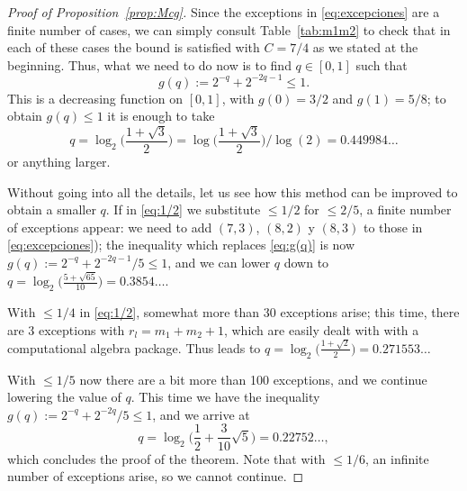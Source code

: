 \documentclass[11pt, a4paper]{article}
\theoremstyle{plain}
\theoremstyle{definition}
\begin{document}
\begin{proof}[Proof of Proposition~\ref{prop:Mcg}]
Since the exceptions in \eqref{eq:excepciones} are a finite number of cases, we can simply consult Table~\ref{tab:m1m2} to check that in each of these cases the bound is satisfied with $C=7/4$ as we stated at the beginning.
Thus, what we need to do now is to find $q \in [0,1]$ such that
\begin{equation}
\label{eq:g(q)}
g(q) := 2^{-q} + 2^{-2q-1} \le 1.
\end{equation}
This is a decreasing function on $[0,1]$, with $g(0)=3/2$ and $g(1)=5/8$; to obtain
$g(q)\le1$ it is enough to take
\[
q = \log_2\bigg(\frac{1+\sqrt{3}}{2}\Big) = \log\Big(\frac{1+\sqrt{3}}{2}\bigg)/\log(2)
= 0.449984\dots
\]
or anything larger. 

Without going into all the details, let us see how this method can be improved to obtain a smaller $q$. If in \eqref{eq:1/2} we substitute $\le 1/2$ for $\le 2/5$, a finite number of exceptions appear: we need to add $(7,3)$, $(8,2)$ y $(8,3)$ to those in \eqref{eq:excepciones}); the inequality which replaces \eqref{eq:g(q)} is now $g(q) := 2^{-q} + 2^{-2q-1}/5 \le 1$, and we can lower $q$ down to $q = \log_2\Big(\frac{5+\sqrt{65}}{10}\Big) = 0.3854\dots$.

With $\le 1/4$ in \eqref{eq:1/2}, somewhat more than 30 exceptions arise; this time, there are 3 exceptions with $r_l=m_1+m_2+1$, which are easily dealt with with a computational algebra package. Thus leads to $q = \log_2\Big(\frac{1+\sqrt{2}}{2}\Big) = 0.271553\dots$

With $\le1/5$ now there are a bit more than 100 exceptions, and we continue lowering the value of $q$. This time we have the inequality $g(q) := 2^{-q} + 2^{-2q}/5 \le 1$, and we arrive at
\[
  q = \log_2 \bigg( \frac{1}{2} + \frac{3}{10} \sqrt{5} \bigg) = 0.22752\dots,
\]
which concludes the proof of the theorem. Note that with $\le1/6$, an infinite number of exceptions arise, so we cannot continue.
\end{proof}
\end{document}
